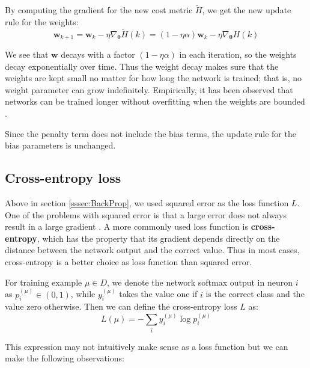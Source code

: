 By computing the gradient for the new cost metric $\tilde{H}$, we get the new update rule for the weights:
\[
\mathbf{w}_{k+1} =
\mathbf{w}_k - \eta \nabla_{\mathbf{\theta}} \tilde{H}(k) =
(1 - \eta \alpha) \mathbf{w}_k - \eta \nabla_{\mathbf{\theta}} H(k)
\]

We see that $\mathbf{w}$ decays with a factor $(1 - \eta \alpha)$ in each iteration, so the weights decay exponentially over time. Thus the weight decay makes sure that the weights are kept small no matter for how long the network is trained; that is, no weight parameter can grow indefinitely. Empirically, it has been observed that networks can be trained longer without overfitting when the weights are bounded \cite[Chapter~3]{NielsenBook}.

Since the penalty term does not include the bias terms, the update rule for the bias parameters is unchanged.


\subsection{Cross-entropy loss} \label{sssec:CrossEntropy}

Above in section \ref{sssec:BackProp}, we used squared error as the loss function $L$. One of the problems with squared error is that a large error does not always result in a large gradient \cite[Chapter~3]{NielsenBook}.
A more commonly used loss function is \textbf{cross-entropy}, which has the property that its gradient depends directly on the distance between the network output and the correct value.
Thus in most cases, cross-entropy is a better choice as loss function than squared error.

For training example $\mu \in D$, we denote the network softmax output in neuron $i$ as $p_i^{(\mu)} \in (0,1)$, while $y_i^{(\mu)}$ takes the value one if $i$ is the correct class and the value zero otherwise. Then we can define the cross-entropy loss $L$ as:
\[
L(\mu) = - \sum_i y_i^{(\mu)} \log p_i^{(\mu)}
\]

%

This expression may not intuitively make sense as a loss function but we can make the following observations:

